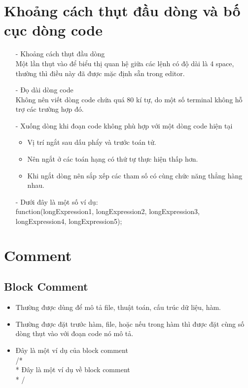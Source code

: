 \documentclass[a4paper]{report}
\begin{document}
    \section{Khoảng cách thụt đầu dòng và bố cục dòng code} 
        \begin{itemize}
            \item[-] Khoảng cách thụt đầu dòng \\
            Một lần thụt vào để biểu thị quan hệ giữa các lệnh có độ dài là 4 space, thường 			thì điều này đã được mặc định sẵn trong editor.
            \item[-] Đọ dài dòng code  \\
            Không nên viết dòng code chứa quá 80 kí tự, do một số terminal không hỗ trợ các 			trường hợp đó.
            \item[-] Xuống dòng khi đoạn code không phù hợp với một dòng code hiện tại
            \begin{itemize}
                \item Vị trí ngắt sau dấu phẩy và trước toán tử.
                \item Nên ngắt ở các toán hạng có thứ tự thực hiện thấp hơn.
                \item Khi ngắt dòng nên sắp xếp các tham số có cùng chức năng thẳng hàng 					nhau.
            \end{itemize}
            \item[-] Dưới đây là một số ví dụ:  \\
            \hspace*{10mm} function(longExpression1, longExpression2, longExpression3, \\
            \hspace*{24mm}    longExpression4, longExpression5);
        \end{itemize}
	\section{Comment}
	\subsection{Block Comment}
	\begin{itemize}
		\item Thường được dùng để mô tả file, thuật toán, cấu trúc dữ liệu, hàm.
		\item Thường được đặt trước hàm, file, hoặc nếu trong hàm thì được đặt cùng số dòng 
			  thụt vào với đoạn code nó mô tả. 
		\item Đây là một ví dụ của block comment \\
		\hspace*{6mm} /* \\
		\hspace*{8mm}   * Đây là một ví dụ về block comment  \\
		\hspace*{8mm}   * / 
	\end{itemize}
\end{document}
